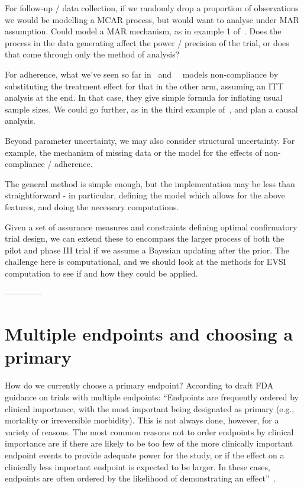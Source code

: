 \documentclass{article} %
\begin{document}
For follow-up / data collection, if we randomly drop a proportion of observations we would be modelling a MCAR process, but would want to analyse under MAR assumption. Could model a MAR mechanism, as in example 1 of~\cite{Landau2013}. Does the process in the data generating affect the power / precision of the trial, or does that come through only the method of analysis?

For adherence, what we've seen so far in~\cite{Fay2006} and~~\cite{Wittes2002} models non-compliance by substituting the treatment effect for that in the other arm, assuming an ITT analysis at the end. In that case, they give simple formula for inflating usual sample sizes. We could go further, as in the third example of~\cite{Landau2013}, and plan a causal analysis.

Beyond parameter uncertainty, we may also consider structural uncertainty. For example, the mechanism of missing data or the model for the effects of non-compliance / adherence.

The general method is simple enough, but the implementation may be less than straightforward - in particular, defining the model which allows for the above features, and doing the necessary computations.

Given a set of assurance measures and constraints defining optimal confirmatory trial design, we can extend these to encompass the larger process of both the pilot and phase III trial if we assume a Bayesian updating after the prior. The challenge here is computational, and we should look at the methods for EVSI computation to see if and how they could be applied.

--------------

\section{Multiple endpoints and choosing a primary}

How do we currently choose a primary endpoint? According to draft FDA guidance on trials with multiple endpoints: ``Endpoints are frequently ordered by clinical importance, with the most important being designated as primary (e.g., mortality or irreversible morbidity). This is not always done, however, for a variety of reasons. The most common reasons not to order endpoints by clinical importance are if there are likely to be too few of the more clinically important endpoint events to provide adequate power for the study, or if the effect on a clinically less important endpoint is expected to be larger. In these cases, endpoints are often ordered by the likelihood of demonstrating an effect''~\cite{FDA2017}.
\end{document}
